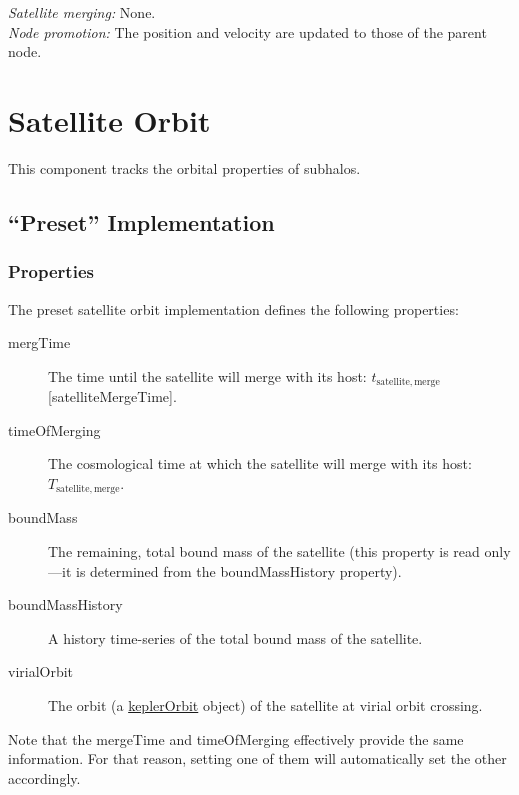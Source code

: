 \noindent\emph{Satellite merging:} None.\\

\noindent\emph{Node promotion:} The position and velocity are updated to those of the parent node.\\

\section{Satellite Orbit}

This \gls{component} tracks the orbital properties of subhalos.

\subsection{``Preset'' Implementation}

\subsubsection{Properties}

The preset satellite orbit implementation defines the following properties:
\begin{description}
 \item [{\normalfont \ttfamily mergTime}] The time until the satellite will merge with its host: $t_\mathrm{satellite, merge}$ [{\normalfont \ttfamily satelliteMergeTime}].
 \item [{\normalfont \ttfamily timeOfMerging}] The cosmological time at which the satellite will merge with its host: $T_\mathrm{satellite, merge}$.
 \item [{\normalfont \ttfamily boundMass}] The remaining, total bound mass of the satellite (this property is read only---it is determined from the {\normalfont \ttfamily boundMassHistory} property).
 \item [{\normalfont \ttfamily boundMassHistory}] A history time-series of the total bound mass of the satellite.
 \item [{\normalfont \ttfamily virialOrbit}] The orbit (a \href{https://github.com/galacticusorg/galacticus/releases/download/masterRelease/Galacticus_Development.pdf\#sec.KeplerOrbits}{\normalfont \ttfamily keplerOrbit} object) of the satellite at virial orbit crossing.
\end{description}

Note that the {\normalfont \ttfamily mergeTime} and {\normalfont \ttfamily timeOfMerging} effectively provide the same information. For that reason, setting one of them will automatically set the other accordingly.

